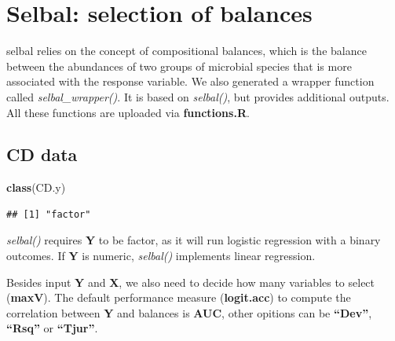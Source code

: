 \documentclass[openany]{book}
\newenvironment{Shaded}{\begin{snugshade}}{\end{snugshade}}
\newcommand{\KeywordTok}[1]{\textcolor[rgb]{0.13,0.29,0.53}{\textbf{#1}}}
\newcommand{\DataTypeTok}[1]{\textcolor[rgb]{0.13,0.29,0.53}{#1}}
\newcommand{\DecValTok}[1]{\textcolor[rgb]{0.00,0.00,0.81}{#1}}
\newcommand{\StringTok}[1]{\textcolor[rgb]{0.31,0.60,0.02}{#1}}
\newcommand{\CommentTok}[1]{\textcolor[rgb]{0.56,0.35,0.01}{\textit{#1}}}
\newcommand{\OperatorTok}[1]{\textcolor[rgb]{0.81,0.36,0.00}{\textbf{#1}}}
\newcommand{\NormalTok}[1]{#1}
\begin{document}
\chapter{Selbal: selection of balances}\label{selbal}

selbal \citep{rivera2018balances} relies on the concept of compositional
balances, which is the balance between the abundances of two groups of
microbial species that is more associated with the response variable. We
also generated a wrapper function called \emph{selbal\_wrapper()}. It is
based on \emph{selbal()}, but provides additional outputs. All these
functions are uploaded via \textbf{functions.R}.

\section{CD data}\label{cd-data-2}

\begin{Shaded}
\begin{Highlighting}[]
\KeywordTok{class}\NormalTok{(CD.y)}
\end{Highlighting}
\end{Shaded}

\begin{verbatim}
## [1] "factor"
\end{verbatim}

\emph{selbal()} requires \textbf{Y} to be factor, as it will run
logistic regression with a binary outcomes. If \textbf{Y} is numeric,
\emph{selbal()} implements linear regression.

Besides input \textbf{Y} and \textbf{X}, we also need to decide how many
variables to select (\textbf{maxV}). The default performance measure
(\textbf{logit.acc}) to compute the correlation between \textbf{Y} and
balances is \textbf{AUC}, other opitions can be \textbf{``Dev''},
\textbf{``Rsq''} or \textbf{``Tjur''}.

\begin{Shaded}
\end{Shaded}
\end{document}
